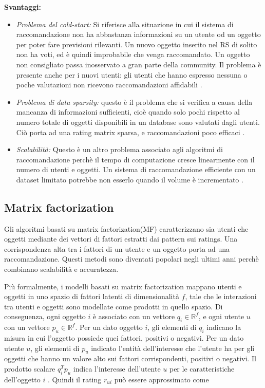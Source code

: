 \documentclass[12pt,italian]{report}
\begin{document}
\noindent \textbf{Svantaggi:}
\begin{itemize}
 \item \textit{Problema del cold-start:} Si riferisce alla situazione in cui il sistema di raccomandazione non ha abbastanza informazioni su un utente od un oggetto per poter fare previsioni rilevanti. Un nuovo oggetto inserito nel RS di solito non ha voti, ed è quindi improbabile che venga raccomandato. Un oggetto non consigliato passa inosservato a gran parte della community. Il problema è presente anche per i nuovi utenti: gli utenti che hanno espresso nessuna o poche valutazioni non ricevono raccomandazioni affidabili \cite{cold-start}.   
 
 \item  \textit{Problema di data sparsity:} questo è il problema che si verifica a causa della mancanza di informazioni sufficienti, cioè quando solo pochi rispetto al numero totale di oggetti disponibili in un database sono valutati dagli utenti. Ciò porta ad una rating matrix sparsa, e raccomandazioni poco efficaci \cite{recsys-principle-methods-evaluation}.
 
 \item \textit{Scalabilità:} Questo è un altro problema associato agli algoritmi di raccomandazione perchè il tempo di computazione cresce linearmente con il numero di utenti e oggetti. Un sistema di raccomandazione efficiente con un dataset limitato potrebbe non esserlo quando il volume è incrementato \cite{recsys-principle-methods-evaluation}.
\end{itemize}

\subsection{Matrix factorization}
Gli algoritmi basati su matrix factorization(MF) caratterizzano sia utenti che oggetti mediante dei vettori di fattori estratti dai pattern sui ratings. Una corrispondenza alta tra i fattori di un utente e un oggetto porta ad una raccomandazione. Questi metodi sono diventati popolari negli ultimi anni perchè combinano scalabilità e accuratezza.

Più formalmente, i modelli basati su matrix factorization mappano utenti e oggetti in uno spazio di fattori latenti di dimensionalità $f$, tale che le interazioni tra utenti e oggetti sono modellate come prodotti in quello spazio. Di conseguenza, ogni oggetto $i$ è associato con un vettore $q_i \in \mathbb{R}^f$, e ogni utente $u$ con un vettore $p_u \in \mathbb{R}^f$. Per un dato oggetto $i$, gli elementi di $q_i$ indicano la misura in cui l'oggetto possiede quei fattori, positivi o negativi. Per un dato utente $u$, gli elementi di $p_u$ indicato l'entità dell'interesse che l'utente ha per gli oggetti che hanno un valore alto sui fattori corrispondenti, positivi o negativi. Il prodotto scalare $q_i^Tp_u$ indica l'interesse dell'utente $u$ per le caratteristiche dell'oggetto $i$ \cite{matrix-factorization}. Quindi il rating $r_{ui}$ può essere approssimato come
\end{document}
